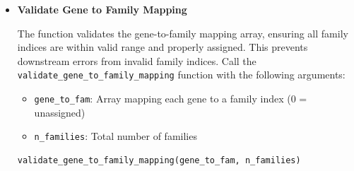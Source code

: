 \begin{enumerate}
\begin{itemize}
                  \begin{itemize}
                    \item \texttt{gene\_to\_fam}: Family assignment array where 0 indicates
                          unassigned genes
                  \end{itemize}
                  
                  \textbf{Return dictionary:}
                  \begin{itemize}
                    \item \textbf{mask}: Boolean array indicating which genes to keep (1
                          = assigned to family, 0 = unassigned)
                          
                    \item \textbf{n\_genes\_kept}: Number of genes kept after filtering
                  \end{itemize}
                  
                  \begin{lstlisting}[language=Python, caption={Python Filter Unassigned Genes}]
filtered_genes = filter_unassigned_genes(gene_to_fam)
                  \end{lstlisting}
                  
            \item \textbf{Validate Gene to Family Mapping}
                  
                  The function validates the gene-to-family mapping array, ensuring all
                  family indices are within valid range and properly assigned. This prevents
                  downstream errors from invalid family indices. Call the \texttt{validate\_gene\_to\_family\_mapping}
                  function with the following arguments:
                  
                  \begin{itemize}
                    \item \texttt{gene\_to\_fam}: Array mapping each gene to a family index
                          (0 = unassigned)
                          
                    \item \texttt{n\_families}: Total number of families
                  \end{itemize}
                  
                  \begin{lstlisting}[language=Python, caption={Python Validate Gene to Family Mapping}]
validate_gene_to_family_mapping(gene_to_fam, n_families)
                  \end{lstlisting}
                  

\end{itemize}
\end{enumerate}
